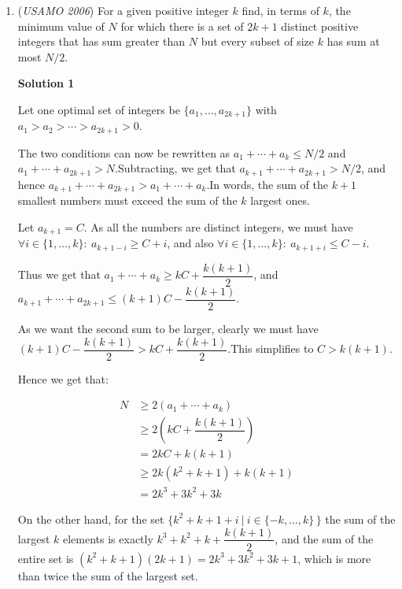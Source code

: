\begin{enumerate}
 Thus, choose $m=j+1$ and $n=x$ to complete the proof.

 <i>Alternate solutions are always welcome. If you have a different, elegant solution to this problem, please \href{https://artofproblemsolving.com/wiki/index.php?title=2006\_USAMO\_Problems/Problem\_1&action=edit}{add it} to this page.</i>



	\item (\textit{USAMO 2006}) For a given positive integer $k$ find, in terms of $k$, the minimum value of $N$ for which there is a set of $2k+1$ distinct positive integers that has sum greater than $N$ but every subset of size $k$ has sum at most $N/2$.


 



\textbf{Solution 1}

Let one optimal set of integers be $\{a_1,\dots,a_{2k+1}\}$ with $a_1 > a_2 > \cdots > a_{2k+1} > 0$.

 The two conditions can now be rewritten as $a_1+\cdots + a_k \leq N/2$ and $a_1+\cdots +a_{2k+1} > N$.Subtracting, we get that $a_{k+1}+\cdots + a_{2k+1} > N/2$, and hence $a_{k+1}+\cdots + a_{2k+1} > a_1+\cdots + a_k$.In words, the sum of the $k+1$ smallest numbers must exceed the sum of the $k$ largest ones.

 Let $a_{k+1}=C$. As all the numbers are distinct integers, we must have $\forall i \in\{1,\dots,k\}:~ a_{k+1-i} \geq C+i$, and also $\forall i \in\{1,\dots,k\}:~ a_{k+1+i} \leq C-i$.

 Thus we get that $a_1+\cdots + a_k \geq kC + \dfrac{k(k+1)}2$, and $a_{k+1}+\cdots + a_{2k+1} \leq (k+1)C - \dfrac{k(k+1)}2$.

 As we want the second sum to be larger, clearly we must have $(k+1)C - \dfrac{k(k+1)}2 > kC + \dfrac{k(k+1)}2$.This simplifies to $C > k(k+1)$.

 Hence we get that:

 
 \begin{align*} N & \geq 2(a_1+\cdots + a_k) \\   & \geq 2\left( kC + \dfrac{k(k+1)}2 \right) \\   & = 2kC + k(k+1) \\   & \geq 2k(k^2+k+1) + k(k+1) \\   & = 2k^3 + 3k^2 + 3k \end{align*}


 On the other hand, for the set $\{ k^2+k+1+i ~|~ i\in\{-k,\dots,k\} \, \}$ the sum of the largest $k$ elements is exactly $k^3 + k^2 + k + \dfrac{k(k+1)}2$, and the sum of the entire set is $(k^2+k+1)(2k+1) = 2k^3 + 3k^2 + 3k + 1$, which is more than twice the sum of the largest set.


\end{enumerate}
